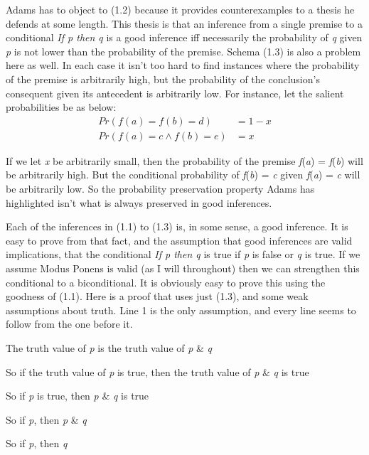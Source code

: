 Adams has to object to (1.2) because it provides counterexamples to a thesis he defends at some length. This thesis is that an inference from a single premise to a conditional \textit{If p then q} is a good inference iff necessarily the probability of \textit{q} given \textit{p} is not lower than the probability of the premise. Schema (1.3) is also a problem here as well. In each case it isn't too hard to find instances where the probability of the premise is arbitrarily high, but the probability of the conclusion's consequent given its antecedent is arbitrarily low. For instance, let the salient probabilities be as below:
\begin{align*}
Pr(f(a) = f(b) = d) &= 1-x \\
Pr(f(a) = c \wedge f(b) = e) &= x
\end{align*}

\noindent If we let \textit{x} be arbitrarily small, then the probability of the premise \textit{f}(\textit{a}) = \textit{f}(\textit{b}) will be arbitrarily high. But the conditional probability of \textit{f}(\textit{b}) = \textit{c} given \textit{f}(\textit{a}) = \textit{c} will be arbitrarily low. So the probability preservation property Adams has highlighted isn't what is always preserved in good inferences.

Each of the inferences in (1.1) to (1.3) is, in some sense, a good inference. It is easy to prove from that fact, and the assumption that good inferences are valid implications, that the conditional \textit{If p then q} is true if \textit{p} is false or \textit{q} is true. If we assume Modus Ponens is valid (as I will throughout) then we can strengthen this conditional to a biconditional. It is obviously easy to prove this using the goodness of (1.1). Here is a proof that uses just (1.3), and some weak assumptions about truth. Line 1 is the only assumption, and every line seems to follow from the one before it.

\renewcommand{\labelenumi}{(\arabic{enumi})}
\begin{enumerate*}
\setcounter{enumi}{0}
\item The truth value of \textit{p} is the truth value of \textit{p} \& \textit{q}

\item So if the truth value of \textit{p} is true, then the truth value of \textit{p} \& \textit{q} is true

\item So if \textit{p} is true, then \textit{p} \& \textit{q} is true

\item So if \textit{p}, then \textit{p} \& \textit{q}

\item So if \textit{p}, then \textit{q}
\end{enumerate*}

